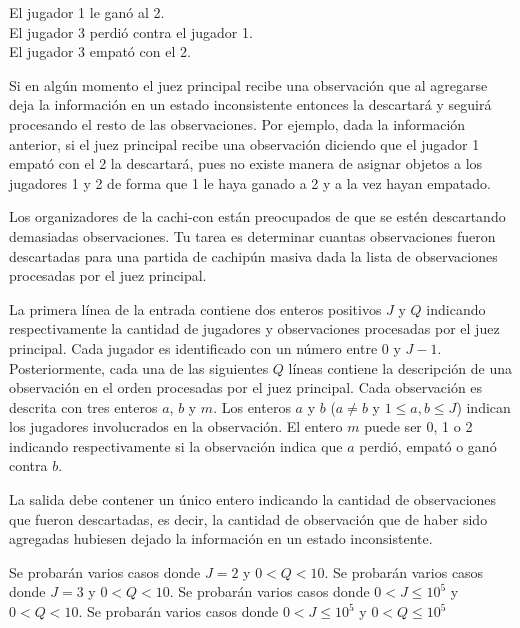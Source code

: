 \documentclass{oci}
\begin{document}
\begin{problemDescription}
    \begin{center}
      El jugador 1 le ganó al 2.\\
      El jugador 3 perdió contra el jugador 1.\\
      El jugador 3 empató con el 2.
    \end{center}

  Si en algún momento el juez principal recibe una observación que al agregarse
  deja la información en un estado inconsistente entonces la descartará y
  seguirá procesando el resto de las observaciones.
  Por ejemplo, dada la información anterior, si el juez principal recibe una
  observación diciendo que el jugador 1 empató con el 2 la descartará, pues
  no existe manera de asignar objetos a los jugadores 1 y 2 de forma que 1 le
  haya ganado a 2 y a la vez hayan empatado.

  Los organizadores de la cachi-con están preocupados de que se estén
  descartando demasiadas observaciones.
  Tu tarea es determinar cuantas observaciones fueron descartadas para una
  partida de cachipún masiva dada la lista de observaciones procesadas por el
  juez principal.
\end{problemDescription}

\begin{inputDescription}
  La primera línea de la entrada contiene dos enteros positivos $J$ y $Q$
  indicando respectivamente la cantidad de jugadores y observaciones procesadas
  por el juez principal.
  Cada jugador es identificado con un número entre 0 y $J-1$.
  Posteriormente, cada una de las siguientes $Q$ líneas contiene la descripción
  de una observación en el orden procesadas por el juez principal.
  Cada observación es descrita con tres enteros $a$, $b$ y $m$.
  Los enteros $a$ y $b$ ($a\neq b$ y $1\leq a, b \leq J$) indican los jugadores
  involucrados en la observación. 
  El entero $m$ puede ser 0, 1 o 2 indicando respectivamente si la observación indica
  que $a$ perdió, empató o ganó contra $b$.
\end{inputDescription}

\begin{outputDescription}
  La salida debe contener un único entero indicando la cantidad de observaciones
  que fueron descartadas, es decir, la cantidad de observación que de haber sido
  agregadas hubiesen dejado la información en un estado inconsistente.
\end{outputDescription}

\begin{scoreDescription}
   Se probarán varios casos donde $J=2$ y $0 < Q < 10$.
   Se probarán varios casos donde $J=3$ y $0 < Q < 10$.
   Se probarán varios casos donde $0 < J \leq 10^5$ y $0 < Q < 10$.
   Se probarán varios casos donde $0 < J \leq 10^5$ y $0 < Q \leq 10^5$
\end{scoreDescription}

\begin{sampleDescription}
\end{sampleDescription}
\end{document}
